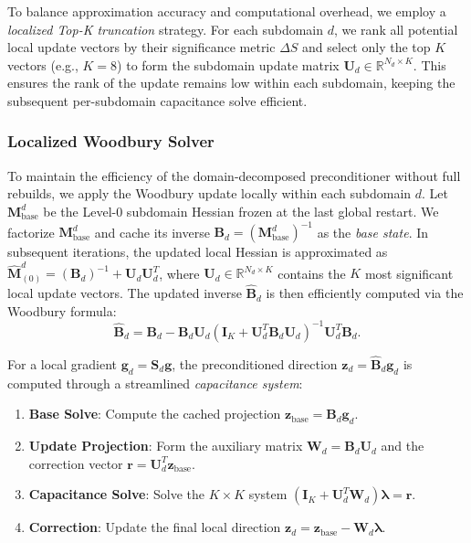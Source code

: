 \documentclass[acmtog,anonymous,review,screen,nonacm]{acmart}
\begin{document}
To balance approximation accuracy and computational overhead, we employ a \textit{localized Top-K truncation} strategy. For each subdomain $d$, we rank all potential local update vectors by their significance metric $\Delta S$ and select only the top $K$ vectors (e.g., $K=8$) to form the subdomain update matrix $\mathbf{U}_d \in \mathbb{R}^{N_d \times K}$. This ensures the rank of the update remains low within each subdomain, keeping the subsequent per-subdomain capacitance solve efficient.

\subsubsection{Localized Woodbury Solver}
To maintain the efficiency of the domain-decomposed preconditioner without full rebuilds, we apply the Woodbury update locally within each subdomain $d$. Let $\mathbf{M}_{\text{base}}^d$ be the Level-0 subdomain Hessian frozen at the last global restart. We factorize $\mathbf{M}_{\text{base}}^d$ and cache its inverse $\mathbf{B}_d = (\mathbf{M}_{\text{base}}^d)^{-1}$ as the \textit{base state}. In subsequent iterations, the updated local Hessian is approximated as $\hat{\mathbf{M}}_{(0)}^d = (\mathbf{B}_d)^{-1} + \mathbf{U}_d \mathbf{U}_d^T$, where $\mathbf{U}_d \in \mathbb{R}^{N_d \times K}$ contains the $K$ most significant local update vectors. The updated inverse $\hat{\mathbf{B}}_d$ is then efficiently computed via the Woodbury formula:
\begin{equation}
    \hat{\mathbf{B}}_d = \mathbf{B}_d - \mathbf{B}_d \mathbf{U}_d \left( \mathbf{I}_K + \mathbf{U}_d^T \mathbf{B}_d \mathbf{U}_d \right)^{-1} \mathbf{U}_d^T \mathbf{B}_d.
\end{equation}

For a local gradient $\mathbf{g}_d = \mathbf{S}_d \mathbf{g}$, the preconditioned direction $\mathbf{z}_d = \hat{\mathbf{B}}_d \mathbf{g}_d$ is computed through a streamlined \textit{capacitance system}:
\begin{enumerate}[leftmargin=*]
    \item \textbf{Base Solve}: Compute the cached projection $\mathbf{z}_{\text{base}} = \mathbf{B}_d \mathbf{g}_d$.
    \item \textbf{Update Projection}: Form the auxiliary matrix $\mathbf{W}_d = \mathbf{B}_d \mathbf{U}_d$ and the correction vector $\mathbf{r} = \mathbf{U}_d^T \mathbf{z}_{\text{base}}$.
    \item \textbf{Capacitance Solve}: Solve the $K \times K$ system $(\mathbf{I}_K + \mathbf{U}_d^T \mathbf{W}_d) \boldsymbol{\lambda} = \mathbf{r}$.
    \item \textbf{Correction}: Update the final local direction $\mathbf{z}_d = \mathbf{z}_{\text{base}} - \mathbf{W}_d \boldsymbol{\lambda}$.
\end{enumerate}
\end{document}

